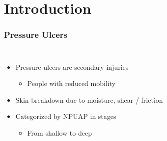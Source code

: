 \documentclass{beamer}
\begin{document}
	\section{Introduction}
		\setcounter{framenumber}{0}
		\begin{frame}
			\frametitle{Pressure Ulcers}
			\begin{columns}[c]
				\begin{itemize}
					\item Pressure ulcers are secondary injuries
					\begin{itemize}
						\item People with reduced mobility
					\end{itemize}

					\item Skin breakdown due to moisture, shear / friction

					\item Categorized by NPUAP in stages
					\begin{itemize}
						\item From shallow to deep
					\end{itemize}
				\end{itemize}

					\begin{figure}
						\centering


\end{figure}
\end{columns}
\end{frame}
\end{document}
